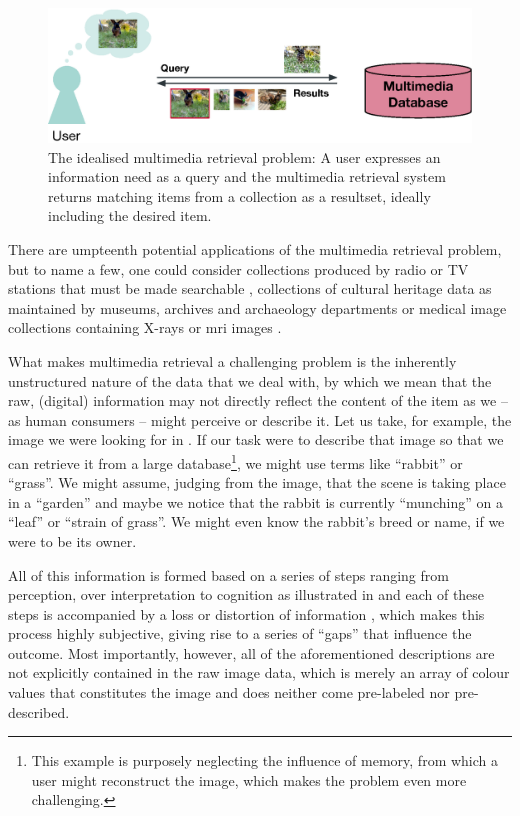 \begin{figure}[tb]
    \centering
    \includegraphics[width=\textwidth]{figures/mr-ideal.eps}
    \caption{The idealised multimedia retrieval problem: A user expresses an information need as a query and the multimedia retrieval system returns matching items from a collection as a resultset, ideally including the desired item.}
    \label{figure:mr-ideal}
\end{figure}

There are umpteenth potential applications of the multimedia retrieval problem, but to name a few, one could consider collections produced by radio or TV stations that must be made searchable \cite{Watanabe:1998Multimedia}, collections of cultural heritage data as maintained by museums, archives and archaeology departments \cite{Tsai:2007Review} or medical image collections containing X-rays or \acrshort{mri} images \cite{Mueller:2004Review}.

What makes multimedia retrieval a challenging problem is the inherently unstructured nature of the data that we deal with, by which we mean that the raw, (digital) information may not directly reflect the content of the item as we -- as human consumers -- might perceive or describe it. Let us take, for example, the image we were looking for in . If our task were to describe that image so that we can retrieve it from a large database\footnote{This example is purposely neglecting the influence of memory, from which a user might reconstruct the image, which makes the problem even more challenging.}, we might use terms like ``rabbit'' or ``grass''. We might assume, judging from the image, that the scene is taking place in a ``garden'' and maybe we notice that the rabbit is currently ``munching'' on a ``leaf'' or ``strain of grass''. We might even know the rabbit's breed or name, if we were to be its owner.

All of this information is formed based on a series of steps ranging from perception, over interpretation to cognition as illustrated in  and each of these steps is accompanied by a loss or distortion of information \cite{Javanmardi:2021Exploring,Rossetto:2018thesis}, which makes this process highly subjective, giving rise to a series of ``gaps'' that influence the outcome. Most importantly, however, all of the aforementioned descriptions are not explicitly contained in the raw image data, which is merely an array of colour values that constitutes the image and does neither come pre-labeled nor pre-described.

